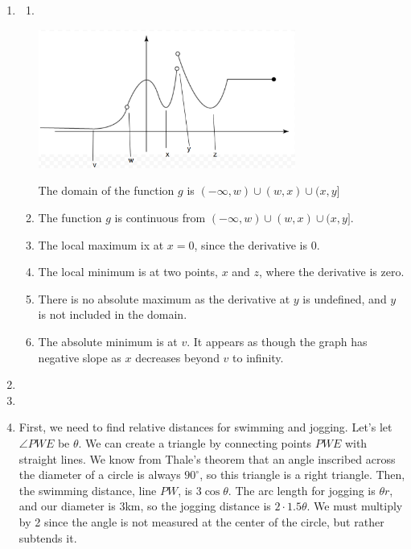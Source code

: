 \documentclass[11pt, letterpaper, twoside]{article}
\begin{document}
\begin{enumerate}
\item 
\begin{enumerate}[label=\alph*)]
\item ‌‌ 

\vspace{0.2cm}
\includegraphics[width=0.7\textwidth]{q1}\par

The domain of the function \(g\) is \((-\infty, w)\cup(w, x)\cup(x, y]\)
\item The function \(g\) is continuous from \((-\infty, w)\cup(w, x)\cup(x, y]\).
\item The local maximum ix at \(x=0\), since the derivative is 0.
\item The local minimum is at two points, \(x\) and \(z\), where the derivative is zero.
\item There is no absolute maximum as the derivative at \(y\) is undefined, and \(y\) is not included in the domain.
\item The absolute minimum is at \(v\). It appears as though the graph has negative slope as \(x\) decreases beyond \(v\) to infinity.
\end{enumerate}
\item %

\item %

\item %
First, we need to find relative distances for swimming and jogging.
Let's let \(\angle PWE\) be \(\theta\).
We can create a triangle by connecting points \(PWE\) with straight lines.
We know from Thale's theorem that an angle inscribed across the diameter of a circle is always \(90^\circ\), so this triangle is a right triangle.
Then, the swimming distance, line \(PW\), is \(3\cos\theta\).
The arc length for jogging is \(\theta r\), and our diameter is 3km, so the jogging distance is \(2\cdot1.5\theta\). 
We must multiply by 2 since the angle is not measured at the center of the circle, but rather subtends it.


\end{enumerate}
\end{document}
